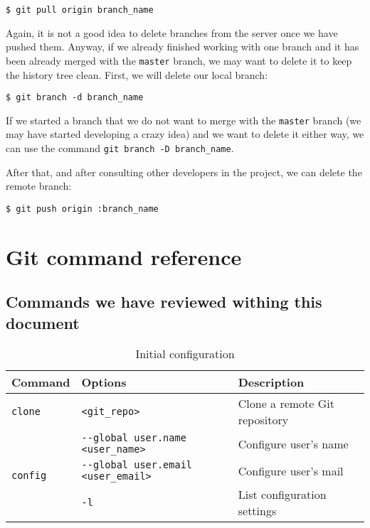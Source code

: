 \documentclass[a4paper,10pt]{article}
\newenvironment{terminal}
  {
    \vspace{+10pt}
    \begin{center}
    \begin{minipage}{0.95\textwidth}
    \begin{framed}
  }
  {
    \end{framed}
    \end{minipage}
    \end{center}
    \vspace{+10pt}
  }
\begin{document}
\begin{terminal}
\begin{verbatim}
$ git pull origin branch_name
\end{verbatim}
\end{terminal}

Again, it is not a good idea to delete branches from the server once
we have pushed them. Anyway, if we already finished working with one
branch and it has been already merged with the \texttt{master} branch,
we may want to delete it to keep the history tree clean. First, we will
delete our local branch:

\begin{terminal}
\begin{verbatim}
$ git branch -d branch_name
\end{verbatim}
\end{terminal}

\begin{tip}
If we started a branch that we do not want to merge with the
\texttt{master} branch (we may have started developing a crazy idea)
and we want to delete it either way, we can use the command
\texttt{git branch -D branch\_name}.
\end{tip}

After that, and after consulting other developers in the project, we
can delete the remote branch:

\begin{terminal}
\begin{verbatim}
$ git push origin :branch_name
\end{verbatim}
\end{terminal}

\section{Git command reference}

\subsection{Commands we have reviewed withing this document}

\begin{table}
\caption{Initial configuration}
\centering
\begin{tabular}{l l l}
\hline\hline
Command & Options & Description \\
\hline\hline
\multirow{1}{*}{\texttt{clone}} & \texttt{<git\_repo>} & Clone a remote Git repository \\ \hline
\multirow{3}{*}{\texttt{config}} & \texttt{-{}-global user.name <user\_name>} & Configure user's name \\
& \texttt{-{}-global user.email <user\_email>} & Configure user's mail \\
& \texttt{-l} & List configuration settings \\ \hline
\hline
\end{tabular}
\end{table}
\end{document}
